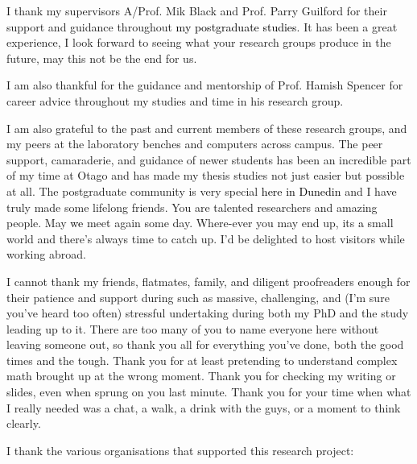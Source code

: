 I thank my supervisors A/Prof. Mik Black and Prof. Parry Guilford for their support and guidance throughout \textcolor{black}{my postgraduate studies}. It has been a great experience, I look forward to seeing what your research groups produce in the future, may this not be the end for us.

I am also thankful for the guidance and mentorship of Prof. Hamish Spencer for career advice throughout my studies and time in his research group.

I am also grateful to the past and current members of these research groups, and my peers at the laboratory benches and computers across campus. The peer support, camaraderie, and guidance of newer students has been an incredible part of my time at Otago and has made my thesis studies not just easier but possible at all. The postgraduate community is very special \textcolor{black}{here in Dunedin} and I have truly made some lifelong friends. You are talented researchers and amazing people. May \textcolor{black}{we} meet again some day. Where-ever you may end up, its \textcolor{black}{a} small world and there's always time to catch up. I'd be delighted to host visitors while working abroad.

I cannot thank my friends, flatmates, family, and diligent proofreaders enough for their patience and support during such as massive, challenging, and (I'm sure you've heard too often) stressful undertaking during both my PhD and the study leading up to it. There are too many of you to name everyone here without leaving someone out, so thank you all for everything you've done, both the good times and the tough. Thank you for at least pretending to understand complex math brought up at the wrong moment. Thank \textcolor{black}{you} for checking my writing or slides, even when sprung on you last minute. Thank you for your time when what I really needed was a chat, a walk, a drink with the guys, or a moment to think clearly.

I thank the various organisations that supported this research project:

